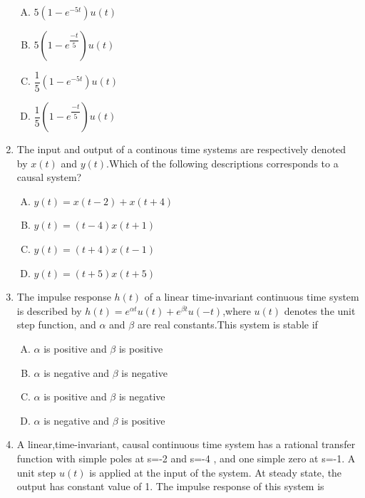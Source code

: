 \documentclass[journal,12pt,twocolumn]{IEEEtran}
\begin{document}
\begin{enumerate}[1.]
\begin{enumerate}[(A)]
\setlength\itemsep{1em}

\item $5(1-e^{-5t})u(t)$
\item $5(1-e^{\dfrac{-t}{5}})u(t)$
\item $\dfrac{1}{5}(1-e^{-5t})u(t)$
\item $\dfrac{1}{5}(1-e^{\dfrac{-t}{5}})u(t)$

\end{enumerate}


\item The input and output of a continous time systems are respectively denoted by $x(t)$ and $y(t)$.Which of the following descriptions corresponds to a causal system?\\
\begin{enumerate}[(A)]

\setlength\itemsep{1em}

\item $y(t)=x(t-2)+x(t+4)$
\item $y(t)=(t-4)x(t+1)$
\item $y(t)=(t+4)x(t-1)$
\item $y(t)=(t+5)x(t+5)$


\end{enumerate}


\item The impulse response $h(t)$ of a linear time-invariant continuous time system is described by $h(t)=e^{\alpha t}u(t)+e^{\beta t}u(-t)$,where $u(t)$ denotes the unit step function, and $\alpha$ and $\beta$ are real constants.This system is stable if\\

\begin{enumerate}[(A)]

\setlength\itemsep{1em}

\item $\alpha$ is positive and $\beta$ is positive
\item $\alpha$ is negative and $\beta$ is negative
\item $\alpha$ is positive and $\beta$ is negative
\item $\alpha$ is negative and $\beta$ is positive


\end{enumerate}

\item A linear,time-invariant, causal continuous time system has a rational transfer function with simple poles at s=-2 and s=-4 , and one simple zero at s=-1. A unit step $u(t)$ is applied at the input of the system. At steady state, the output has constant value of 1. The impulse response of this system is\\
\begin{enumerate}[(A)]


\end{enumerate}
\end{enumerate}
\end{document}
